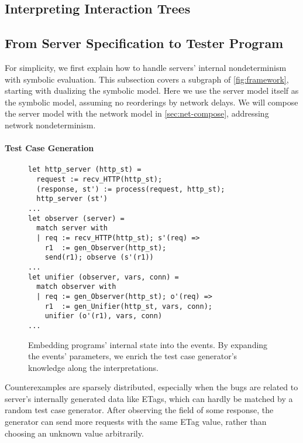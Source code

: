 \subsection{Interpreting Interaction Trees}
\label{sec:interpret}

\subsection{From Server Specification to Tester Program}
\label{sec:derive-internal}

For simplicity, we first explain how to handle servers' internal nondeterminism
with symbolic evaluation.  This subsection covers a subgraph of
\autoref{fig:framework}, starting with dualizing the symbolic model.
Here we use the server model itself as the symbolic model, assuming no
reorderings by network delays.  We will compose the server model with the
network model in \autoref{sec:net-compose}, addressing network nondeterminism.

\paragraph*{Test Case Generation}

\begin{figure}
  \begin{lstlisting}[style=customcoq]
let http_server (http_st) =
  request := recv_HTTP(http_st);
  (response, st') := process(request, http_st);
  http_server (st')
...
let observer (server) =
  match server with
  | req := recv_HTTP(http_st); s'(req) =>
    r1  := gen_Observer(http_st);
    send(r1); observe (s'(r1))
...
let unifier (observer, vars, conn) =
  match observer with
  | req := gen_Observer(http_st); o'(req) =>
    r1  := gen_Unifier(http_st, vars, conn);
    unifier (o'(r1), vars, conn)
...
  \end{lstlisting}
  \caption{Embedding programs' internal state into the events.  By
    expanding the events' parameters, we enrich the test case generator's
    knowledge along the interpretations.}
  \label{fig:test-case}
\end{figure}

Counterexamples are sparsely distributed, especially when the bugs are related
to server's internally generated data like ETags, which can hardly be matched by
a random test case generator.  After observing the  field of some
response, the generator can send more requests with the same ETag value, rather
than choosing an unknown value arbitrarily.

